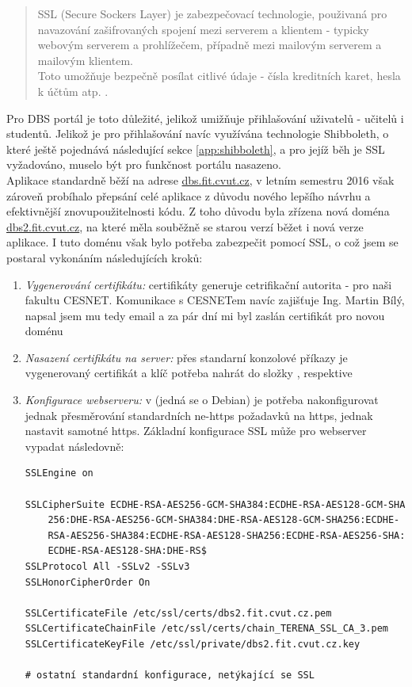\begin{quote}
SSL (Secure Sockers Layer) je zabezpečovací technologie, použivaná pro navazování zašifrovaných spojení mezi serverem a klientem - typicky webovým serverem a prohlížečem, případně mezi mailovým serverem a mailovým klientem.\\
Toto umožňuje bezpečně posílat citlivé údaje - čísla kreditních karet, hesla k účtům atp. \cite{ssl}.
\end{quote}
Pro DBS portál je toto důležité, jelikož umižňuje přihlašování uživatelů - učitelů i studentů. Jelikož je pro přihlašování navíc využívána technologie Shibboleth, o které ještě pojednává následující sekce \ref{app:shibboleth}, a pro jejíž běh je SSL vyžadováno, muselo být pro funkčnost portálu nasazeno.\\
Aplikace standardně běží na adrese \url{dbs.fit.cvut.cz}, v letním semestru 2016 však zároveň probíhalo přepsání celé aplikace z důvodu nového lepšího návrhu a efektivnější znovupoužitelnosti kódu. Z toho důvodu byla zřízena nová doména \url{dbs2.fit.cvut.cz}, na které měla souběžně se starou verzí běžet i nová verze aplikace. I tuto doménu však bylo potřeba zabezpečit pomocí SSL, o což jsem se postaral vykonáním následujících kroků:
\begin{enumerate}
	\item \emph{Vygenerování certifikátu:} certifikáty generuje cetrifikační autorita - pro naši fakultu CESNET. Komunikace s CESNETem navíc zajišťuje Ing. Martin Bílý, napsal jsem mu tedy email a za pár dní mi byl zaslán certifikát pro novou doménu
	\item \emph{Nasazení certifikátu na server:} přes standarní konzolové příkazy je vygenerovaný certifikát a klíč potřeba nahrát do složky , respektive 
	\item \emph{Konfigurace webserveru:} v  (jedná se o Debian) je potřeba nakonfigurovat jednak přesměrování standardních ne-https požadavků na https, jednak nastavit samotné https. Základní konfigurace SSL může pro  webserver vypadat následovně:
	\expandafter\def\csname PY@tok@err\endcsname{} %
	\begin{verbatim}
SSLEngine on

SSLCipherSuite ECDHE-RSA-AES256-GCM-SHA384:ECDHE-RSA-AES128-GCM-SHA
    256:DHE-RSA-AES256-GCM-SHA384:DHE-RSA-AES128-GCM-SHA256:ECDHE-
    RSA-AES256-SHA384:ECDHE-RSA-AES128-SHA256:ECDHE-RSA-AES256-SHA:
    ECDHE-RSA-AES128-SHA:DHE-RS$
SSLProtocol All -SSLv2 -SSLv3
SSLHonorCipherOrder On

SSLCertificateFile /etc/ssl/certs/dbs2.fit.cvut.cz.pem
SSLCertificateChainFile /etc/ssl/certs/chain_TERENA_SSL_CA_3.pem
SSLCertificateKeyFile /etc/ssl/private/dbs2.fit.cvut.cz.key

# ostatní standardní konfigurace, netýkající se SSL
	\end{verbatim}
\end{enumerate}

